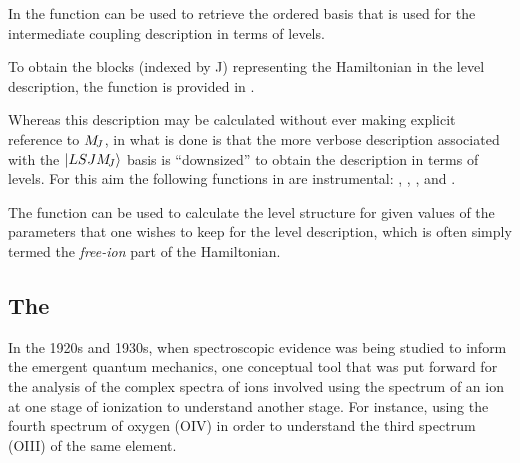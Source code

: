 \documentclass[11pt, twoside,openright]{article}
\begin{document}
In \qlanth the function  can be used to retrieve the ordered basis that is used for the intermediate coupling description in terms of levels.



To obtain the blocks (indexed by J) representing the Hamiltonian in the level description, the function  is provided in \qlanth.

 

Whereas this description may be calculated without ever making explicit reference to $M_{\!{J}}$, in \qlanth what is done is that the more verbose description associated with the $|LSJM_{\!{J}}\rangle$ basis is ``downsized'' to obtain the description in terms of levels. For this aim the following functions in \qlanth are instrumental: , , , and .

The function  can be used to calculate the level structure for given values of the parameters that one wishes to keep for the level description, which is often simply termed the \textit{free-ion} part of the Hamiltonian.



\subsection{The \cfps} 

In the 1920s and 1930s, when spectroscopic evidence was being studied to inform the emergent quantum mechanics, one conceptual tool that was put forward for the analysis of the complex spectra of ions \cite{bacher_atomic_1934} involved using the spectrum of an ion at one stage of ionization to understand another stage.  For instance, using the fourth spectrum of oxygen (OIV) in order to understand the third spectrum (OIII) of the same element. 
\end{document}
